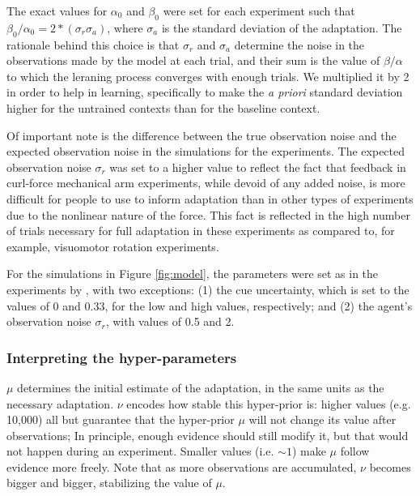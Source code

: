 \documentclass[a4paper,doc,floatsintext,natbib]{apa6}
\def \fref #1{Figure \ref{#1}}     %
\begin{document}
The exact values for $\alpha_0$ and $\beta_0$ were set for each experiment such that $\beta_0 / \alpha_0 = 2 * (\sigma_r \sigma_a)$, where $\sigma_a$ is the standard deviation of the adaptation. The rationale behind this choice is that $\sigma_r$ and $\sigma_a$ determine the noise in the observations made by the model at each trial, and their sum is the value of $\beta / \alpha$ to which the leraning process converges with enough trials. We multiplied it by 2 in order to help in learning, specifically to make the \textit{a priori} standard deviation higher for the untrained contexts than for the baseline context.

Of important note is the difference between the true observation noise and the expected observation noise in the simulations for the \cite{Davidson_Scaling_2004} experiments. The expected observation noise $\sigma_r$ was set to a higher value to reflect the fact that feedback in curl-force mechanical arm experiments, while devoid of any added noise, is more difficult for people to use to inform adaptation than in other types of experiments due to the nonlinear nature of the force. This fact is reflected in the high number of trials necessary for full adaptation in these experiments as compared to, for example, visuomotor rotation experiments.

For the simulations in \fref{fig:model}, the parameters were set as in the experiments by \cite{Davidson_Scaling_2004}, with two exceptions: (1) the cue uncertainty, which is set to the values of 0 and 0.33, for the low and high values, respectively; and (2) the agent's observation noise $\sigma_r$, with values of 0.5 and 2.

\subsubsection{Interpreting the hyper-parameters}
\label{sec:interpreting-hyperparameters}
$\mu$ determines the initial estimate of the adaptation, in the same units as the necessary adaptation. $\nu$ encodes how stable this hyper-prior is: higher values (e.g. 10,000) all but guarantee that the hyper-prior $\mu$ will not change its value after observations; In principle, enough evidence should still modify it, but that would not happen during an experiment. Smaller values (i.e. $\sim 1$) make $\mu$ follow evidence more freely. Note that as more observations are accumulated, $\nu$ becomes bigger and bigger, stabilizing the value of $\mu$.
\end{document}
